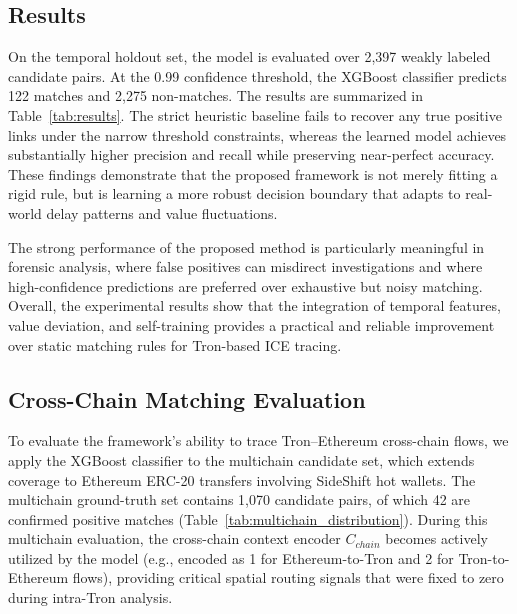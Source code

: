 \documentclass[journal]{IEEEtran}
\begin{document}
    \subsection{Results}
    
    On the temporal holdout set, the model is evaluated over 2,397 weakly labeled candidate pairs. At the 0.99 confidence threshold, the XGBoost classifier predicts 122 matches and 2,275 non-matches. The results are summarized in Table~\ref{tab:results}. The strict heuristic baseline fails to recover any true positive links under the narrow threshold constraints, whereas the learned model achieves substantially higher precision and recall while preserving near-perfect accuracy. These findings demonstrate that the proposed framework is not merely fitting a rigid rule, but is learning a more robust decision boundary that adapts to real-world delay patterns and value fluctuations.
    
    \begin{table}[t]
    \centering
    \caption{Temporal holdout evaluation at the high-confidence threshold of 0.99.}
    \label{tab:results}
    \end{table}
    
    The strong performance of the proposed method is particularly meaningful in forensic analysis, where false positives can misdirect investigations and where high-confidence predictions are preferred over exhaustive but noisy matching. Overall, the experimental results show that the integration of temporal features, value deviation, and self-training provides a practical and reliable improvement over static matching rules for Tron-based ICE tracing.
    
    \subsection{Cross-Chain Matching Evaluation}
    
    To evaluate the framework's ability to trace Tron–Ethereum cross-chain flows,
    we apply the XGBoost classifier to the multichain candidate set, which extends
    coverage to Ethereum ERC-20 transfers involving SideShift hot wallets. The
    multichain ground-truth set contains 1,070 candidate pairs, of which 42 are
    confirmed positive matches (Table~\ref{tab:multichain_distribution}).
    During this multichain evaluation, the cross-chain context encoder $C_{chain}$ becomes actively utilized by the model (e.g., encoded as 1 for Ethereum-to-Tron and 2 for Tron-to-Ethereum flows), providing critical spatial routing signals that were fixed to zero during intra-Tron analysis.
    
\end{document}
